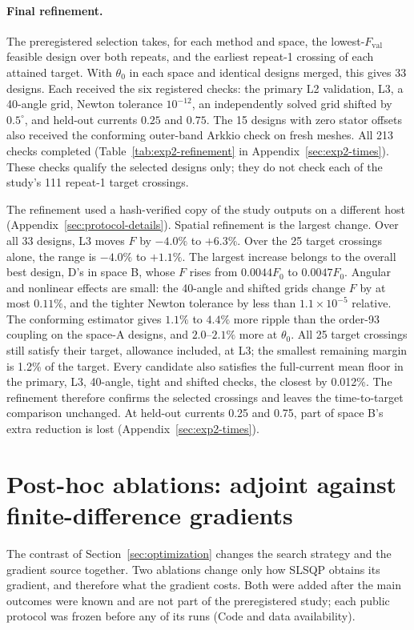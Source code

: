 \paragraph{Final refinement.}\label{sec:exp2-refinement}
The preregistered selection takes, for each method and space, the
lowest-$F_{\mathrm{val}}$ feasible design over both repeats, and the
earliest repeat-1 crossing of each attained target. With $\theta_0$ in
each space and identical designs merged, this gives 33 designs. Each
received the six registered checks: the primary L2 validation, L3, a
40-angle grid, Newton tolerance $10^{-12}$, an independently solved grid
shifted by $0.5^\circ$, and held-out currents $0.25$ and $0.75$. The 15
designs with zero stator offsets also received the conforming outer-band
Arkkio check on fresh meshes. All 213 checks completed
(Table~\ref{tab:exp2-refinement} in Appendix~\ref{sec:exp2-times}). These checks qualify the selected
designs only; they do not check each of the study's 111 repeat-1
target crossings.

The refinement used a hash-verified copy of the study outputs on a
different host (Appendix~\ref{sec:protocol-details}). Spatial refinement is the largest change. Over all 33 designs, L3 moves
$F$ by $-4.0\%$ to $+6.3\%$. Over the 25 target crossings alone, the range
is $-4.0\%$ to $+1.1\%$. The largest increase belongs to the overall best
design, D's in space B, whose $F$ rises from $0.0044F_0$ to $0.0047F_0$.
Angular and nonlinear effects are small: the 40-angle and shifted grids
change $F$ by at most $0.11\%$, and the tighter Newton tolerance by less
than $1.1\times10^{-5}$ relative. The conforming estimator gives $1.1\%$ to
$4.4\%$ more ripple than the order-93 coupling on the space-A designs, and
$2.0$--$2.1\%$ more at $\theta_0$. All 25 target crossings still satisfy
their target, allowance included, at L3; the smallest remaining margin is
1.2\% of the target. Every candidate also satisfies the full-current mean
floor in the primary, L3, 40-angle, tight and shifted checks, the closest
by 0.012\%. The refinement therefore confirms the selected crossings and
leaves the time-to-target comparison unchanged. At held-out currents
0.25 and 0.75, part of space B's extra reduction is lost
(Appendix~\ref{sec:exp2-times}).

\section{Post-hoc ablations: adjoint against finite-difference gradients}\label{sec:exp2-fd}
The contrast of Section~\ref{sec:optimization} changes the search strategy
and the gradient source together. Two ablations change only how SLSQP
obtains its gradient, and therefore what the gradient costs. Both were
added after the main outcomes were known and are not part of the
preregistered study; each public protocol was frozen before any of its
runs (Code and data availability).

